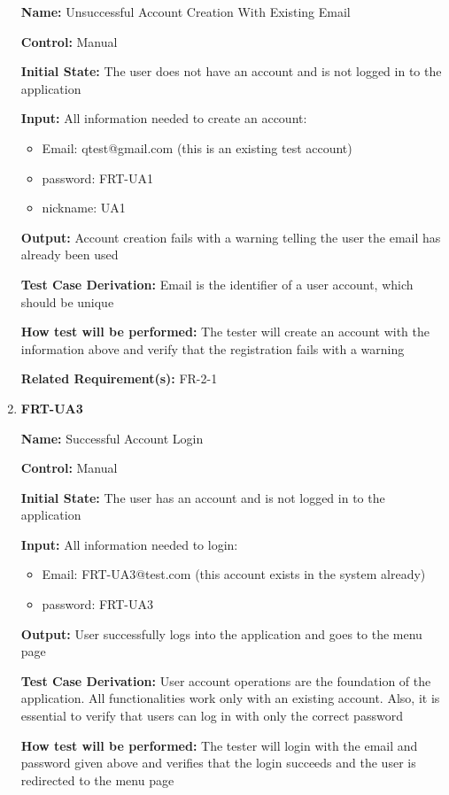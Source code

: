 \documentclass[12pt, titlepage]{article}
\begin{document}
\begin{enumerate}
\textbf{Name:} Unsuccessful Account Creation With Existing Email

\textbf{Control:} Manual
					
\textbf{Initial State:} The user does not have an account and is not logged in to the application

\textbf{Input:} All information needed to create an account:
\begin{itemize}
\item Email: qtest@gmail.com (this is an existing test account)
\item password: FRT-UA1
\item nickname: UA1
\end{itemize}
					
\textbf{Output:} Account creation fails with a warning telling the user the email has already been used

\textbf{Test Case Derivation:} Email is the identifier of a user account, which should be unique
					
\textbf{How test will be performed:} The tester will create an account with the information above and verify that the registration fails with a warning

\textbf{Related Requirement(s):} FR-2-1

\item{\textbf{FRT-UA3}}

\textbf{Name:} Successful Account Login

\textbf{Control:} Manual
					
\textbf{Initial State:} The user has an account and is not logged in to the application

\textbf{Input:} All information needed to login:
\begin{itemize}
\item Email: FRT-UA3@test.com (this account exists in the system already)
\item password: FRT-UA3
\end{itemize}
					
\textbf{Output:} User successfully logs into the application and goes to the menu page

\textbf{Test Case Derivation:} User account operations are the foundation of the application. All functionalities work only with an existing account. Also, it is essential to verify that users can log in with only the correct password 
					
\textbf{How test will be performed:} The tester will login with the email and password given above and verifies that the login succeeds and the user is redirected to the menu page


\end{enumerate}
\end{document}
